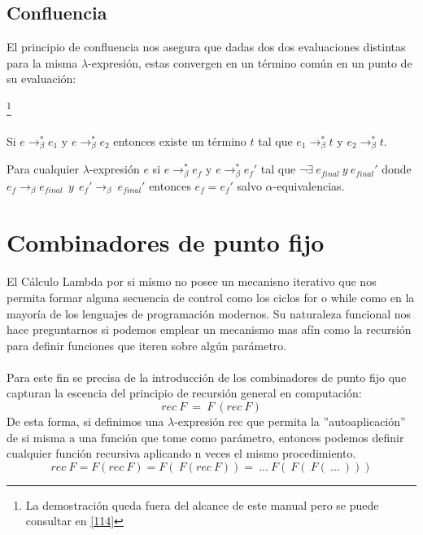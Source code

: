                 \subsection{Confluencia}
                    El principio de confluencia nos asegura que dadas dos dos evaluaciones distintas para la misma $\lambda$-expresión, estas convergen en un término común en un punto de su evaluación:

                    \begin{theorem}\footnote{La demostración queda fuera del alcance de este manual pero se puede consultar en \hyperlink{114}{[114]}}\\\\
 Si $e\to_\beta^* e_1$ y $e\to_\beta^*e_2$ entonces existe un término $t$ tal que  $e_1\to_\beta^* t$ y $e_2\to_\beta^* t$.
                    \end{theorem}

                    \begin{corollary}
Para cualquier $\lambda$-expresión $e$ si $e\to_\beta^*e_f$ y $e\to_\beta^*e_f'$ tal que  $\neg \exists\ e_{final}\ y\ e_{final}'$ donde $e_f \rightarrow_{\beta} e_{final}\ \ y\ \ e_f' \rightarrow_{\beta}\ e_{final}'$
entonces $e_f = e_f'$ salvo $\alpha$-equivalencias. 
                    \end{corollary}

        \section{Combinadores de punto fijo}
                    El Cálculo Lambda por si mísmo no posee un mecanisno iterativo que nos permita formar alguna secuencia de control como los ciclos \textsf{for} o \textsf{while} como en la mayoría de los lenguajes de programación modernos. Su naturaleza funcional nos hace preguntarnos si podemos emplear un mecanismo mas afín como la recursión para definir funciones que iteren sobre algún parámetro.\\\\
                   Para este fin se precisa de la introducción de los combinadores de punto fijo que capturan la escencia del principio de recursión general en computación:
                    $$ rec\ F\ =\ F\ (rec\ F) $$
                    De esta forma, si definimos una $\lambda$-expresión rec que permita la ''autoaplicación'' de si misma a una función que tome como parámetro, entonces podemos definir cualquier función recursiva aplicando n veces el mismo procedimiento.
                    $$rec\ F = F(rec\ F) = F(\ F(rec\ F)) =\ ...\ F(\ F(\ F(\ ...\ )))$$
                    
